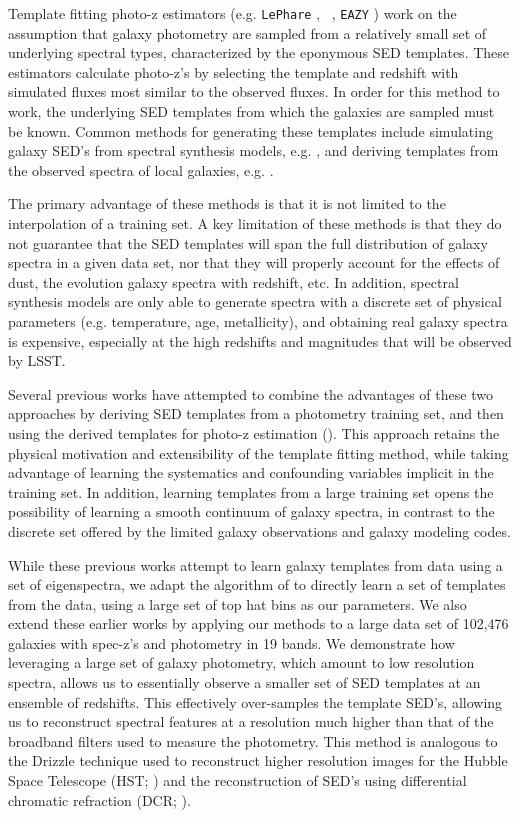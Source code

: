 Template fitting photo-z estimators (e.g. \texttt{LePhare} \citealt{Arnouts1999}, \bpz\ \citealt{Benitez2000a}, \texttt{EAZY} \citealt{Brammer2008}) work on the assumption that galaxy photometry are sampled from a relatively small set of underlying spectral types, characterized by the eponymous SED templates. 
These estimators calculate photo-z's by selecting the template and redshift with simulated fluxes most similar to the observed fluxes. 
In order for this method to work, the underlying SED templates from which the galaxies are sampled must be known. 
Common methods for generating these templates include simulating galaxy SED's from spectral synthesis models, e.g. \citet{BruzualA.1993a}, and deriving templates from the observed spectra of local galaxies, e.g. \citet{Benitez2004a}. 

The primary advantage of these methods is that it is not limited to the interpolation of a training set. 
A key limitation of these methods is that they do not guarantee that the SED templates will span the full distribution of galaxy spectra in a given data set, nor that they will properly account for the effects of dust, the evolution galaxy spectra with redshift, etc.
In addition, spectral synthesis models are only able to generate spectra with a discrete set of physical parameters (e.g. temperature, age, metallicity), and obtaining real galaxy spectra is expensive, especially at the high redshifts and magnitudes that will be observed by LSST.

Several previous works have attempted to combine the advantages of these two approaches by deriving SED templates from a photometry training set, and then using the derived templates for photo-z estimation (\citealt{Budavari2000b,Csabai2000}).
This approach retains the physical motivation and extensibility of the template fitting method, while taking advantage of learning the systematics and confounding variables implicit in the training set.
In addition, learning templates from a large training set opens the possibility of learning a smooth continuum of galaxy spectra, in contrast to the discrete set offered by the limited galaxy observations and galaxy modeling codes.

While these previous works attempt to learn galaxy templates from data using a set of eigenspectra, we adapt the algorithm of \citet{Budavari2000b} to directly learn a set of templates from the data, using a large set of top hat bins as our parameters.
We also extend these earlier works by applying our methods to a large data set of 102,476 galaxies with spec-z's and photometry in 19 bands.
We demonstrate how leveraging a large set of galaxy photometry, which amount to low resolution spectra, allows us to essentially observe a smaller set of SED templates at an ensemble of redshifts.
This effectively over-samples the template SED's, allowing us to reconstruct spectral features at a resolution much higher than that of the broadband filters used to measure the photometry.
This method is analogous to the Drizzle technique used to reconstruct higher resolution images for the Hubble Space Telescope (HST; \citealt{Fruchter2002}) and the reconstruction of SED's using differential chromatic refraction (DCR; \citealt{Lee2019}).

